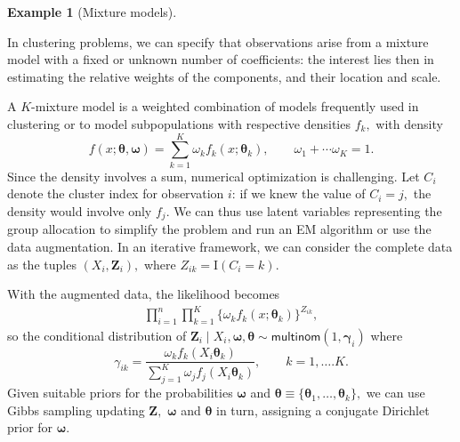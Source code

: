 \documentclass[
  11pt,
  letterpaper,
]{scrbook}
\theoremstyle{definition}
\theoremstyle{plain}
\theoremstyle{plain}
\theoremstyle{plain}
\theoremstyle{definition}
\newtheorem{example}{Example}[chapter]
\theoremstyle{definition}
\theoremstyle{remark}
\begin{document}
\begin{example}[Mixture
models]\protect\hypertarget{exm-mixture}{}\label{exm-mixture}

In clustering problems, we can specify that observations arise from a
mixture model with a fixed or unknown number of coefficients: the
interest lies then in estimating the relative weights of the components,
and their location and scale.

A \(K\)-mixture model is a weighted combination of models frequently
used in clustering or to model subpopulations with respective densities
\(f_k,\) with density
\[f(x; \boldsymbol{\theta}, \boldsymbol{\omega}) = \sum_{k=1}^K \omega_kf_k(x; \boldsymbol{\theta}_k), \qquad \omega_1 + \cdots \omega_K=1.\]
Since the density involves a sum, numerical optimization is challenging.
Let \(C_i\) denote the cluster index for observation \(i\): if we knew
the value of \(C_i =j,\) the density would involve only \(f_j.\) We can
thus use latent variables representing the group allocation to simplify
the problem and run an EM algorithm or use the data augmentation. In an
iterative framework, we can consider the complete data as the tuples
\((X_i, \boldsymbol{Z}_i),\) where \(Z_{ik} = \mathrm{I}(C_i=k).\)

With the augmented data, the likelihood becomes \begin{align*}
\prod_{i=1}^n \prod_{k=1}^K \{\omega_kf_k(x; \boldsymbol{\theta}_k)\}^{Z_{ik}},
\end{align*} so the conditional distribution of
\(\boldsymbol{Z}_i \mid X_i, \boldsymbol{\omega}, \boldsymbol{\theta} \sim \mathsf{multinom}(1, \boldsymbol{\gamma}_{i})\)
where
\[\gamma_{ik} = \frac{\omega_k f_k(X_i\boldsymbol{\theta}_k)}{\sum_{j=1}^K \omega_jf_j(X_i\boldsymbol{\theta}_k)}, \qquad k=1, \ldots. K.\]
Given suitable priors for the probabilities \(\boldsymbol{\omega}\) and
\(\boldsymbol{\theta} \equiv \{\boldsymbol{\theta}_1, \ldots, \boldsymbol{\theta}_k\},\)
we can use Gibbs sampling updating \(\boldsymbol{Z},\)
\(\boldsymbol{\omega}\) and \(\boldsymbol{\theta}\) in turn, assigning a
conjugate Dirichlet prior for \(\boldsymbol{\omega}.\)

\end{example}
\end{document}

